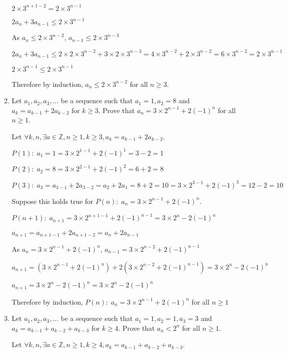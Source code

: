 \documentclass[12pt,letterpaper,titlepage]{article}
\begin{document}
\begin{raggedright}
\begin{enumerate}
$ 2 \times 3^{n + 1 −2} = 2\times 3^{n-1}$

$2a_n + 3a_{n−1} \leq 2\times 3^{n-1}$

As $a_n \leq 2\times 3^{n-2}$, $a_{n-1} \leq 2\times 3^{n-3}$

$2a_n + 3a_{n−1} \leq 2\times2\times 3^{n-2} + 3\times2\times 3^{n-3} = 4\times 3^{n-2} + 2\times 3^{n-2}=6\times 3^{n-2}=2\times 3^{n-1}$

$2\times 3^{n-1} \leq 2\times 3^{n-1}$

Therefore by induction, $a_n \leq 2 \times 3^{n−2}$ for all $n\geq 3$.

\clearpage
\item Let $a_1, a_2, a_3, ...$ be a sequence such that $a_1 = 1, a_2 = 8$ and $a_k = a_{k−1} + 2a_{k−2}$ for $k \geq 3$. Prove that $a_n = 3 \times 2^{n−1} + 2(−1)^n$ for all $n \geq 1$.

Let $\forall k, n, \exists a \in \mathbb{Z}, n \geq 1, k \geq 3, a_k = a_{k−1} + 2a_{k−2}$.

$P(1):\; a_1 = 1 = 3 \times 2^{1−1} + 2(−1)^1=3-2=1$

$P(2):\; a_2 = 8 = 3 \times 2^{2−1} + 2(−1)^2=6+2=8$

$P(3):\; a_3 = a_{3−1} + 2a_{3−2} = a_2 + 2a_1 = 8 + 2 = 10 = 3 \times 2^{3−1} + 2(−1)^3 = 12 - 2 = 10$

Suppose this holds true for $P(n):\; a_n = 3 \times 2^{n−1} + 2(−1)^n$.

$P(n+1):\; a_{n+1} = 3 \times 2^{n+1−1} + 2(−1)^{n-1} = 3 \times 2^{n} - 2(−1)^{n}$

$a_{n+1} = a_{n+1−1} + 2a_{n+1-2} = a_{n} + 2a_{n-1}$

As $a_n = 3 \times 2^{n−1} + 2(−1)^n$, $a_{n-1} = 3 \times 2^{n−2} + 2(−1)^{n-1}$

$a_{n+1} = (3 \times 2^{n−1} + 2(−1)^n) + 2(3 \times 2^{n−2} + 2(−1)^{n-1}) = 3 \times 2^{n} - 2(−1)^n$

$a_{n+1} = 3 \times 2^{n} - 2(−1)^n = 3 \times 2^{n} - 2(−1)^n$

Therefore by induction, $P(n):\; a_n = 3 \times 2^{n−1} + 2(−1)^n$ for all $n\geq 1$

\item Let $a_1, a_2, a_3, ...$ be a sequence such that $a_1 = 1, a_2 = 1, a_3 = 3$ and $a_k = a_{k−1} + a_{k−2} + a_{k−3}$ for $k \geq 4$. Prove that $a_n < 2^n$ for all $n \geq 1$.

Let $\forall k, n, \exists a \in \mathbb{Z}, n \geq 1, k \geq 4, a_k = a_{k−1} + a_{k−2} + a_{k−3}$.


\end{enumerate}
\end{raggedright}
\end{document}
